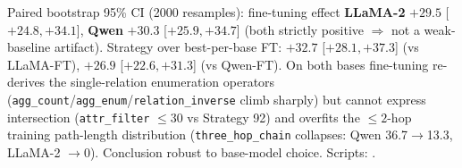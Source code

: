\documentclass[review]{elsarticle}
\newcommand{\qtype}[1]{\texttt{\small #1}}
\begin{document}
Paired bootstrap 95\% CI (2000 resamples): fine-tuning effect \textbf{LLaMA-2} $+29.5$ [$+24.8, +34.1$], \textbf{Qwen} $+30.3$ [$+25.9, +34.7$] (both strictly positive $\Rightarrow$ not a weak-baseline artifact). Strategy over best-per-base FT: $+32.7$ [$+28.1, +37.3$] (vs LLaMA-FT), $+26.9$ [$+22.6, +31.3$] (vs Qwen-FT). On both bases fine-tuning re-derives the single-relation enumeration operators (\qtype{agg\_count}/\qtype{agg\_enum}/\qtype{relation\_inverse} climb sharply) but cannot express intersection (\qtype{attr\_filter} $\leq$30 vs Strategy 92) and overfits the ${\leq}2$-hop training path-length distribution (\qtype{three\_hop\_chain} collapses: Qwen 36.7$\to$13.3, LLaMA-2 $\to$0). Conclusion robust to base-model choice. Scripts: .
\end{document}
